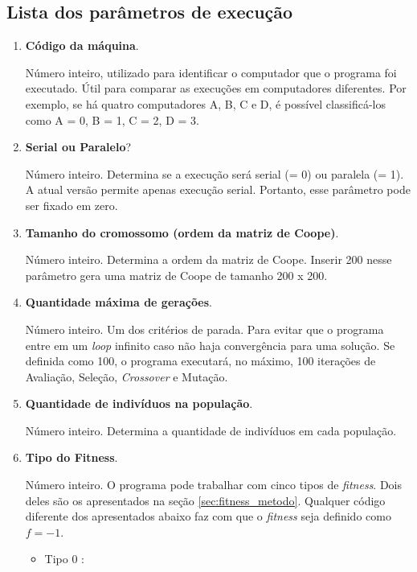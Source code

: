\subsection{Lista dos parâmetros de execução}
\label{sec:listaParametros}
	\begin{enumerate}
		\item \textbf{Código da máquina}.
		
				Número inteiro, utilizado para identificar o computador que o programa foi executado. Útil para comparar as execuções em computadores diferentes. Por exemplo, se há quatro computadores A, B, C e D, é possível classificá-los como A = 0, B = 1, C = 2, D = 3.
				
		\item \textbf{Serial ou Paralelo}?
		
				Número inteiro. Determina se a execução será serial (= 0) ou paralela (= 1). A atual versão permite apenas execução serial. Portanto, esse parâmetro pode ser fixado em zero.
				
		\item \textbf{Tamanho do cromossomo (ordem da matriz de Coope)}.
		
				Número inteiro. Determina a ordem da matriz de Coope. Inserir 200 nesse parâmetro gera uma matriz de Coope de tamanho 200 x 200.
			
		\item \textbf{Quantidade máxima de gerações}.
		
				Número inteiro. Um dos critérios de parada. Para evitar que o programa entre em um \emph{loop} infinito caso não haja convergência para uma solução. Se definida como 100, o programa executará, no máximo, 100 iterações de Avaliação, Seleção, \emph{Crossover} e Mutação.
		
		\item \textbf{Quantidade de indivíduos na população}.
		
		Número inteiro. Determina a quantidade de indivíduos em cada população.
		
		\item \textbf{Tipo do Fitness}.
		
		Número inteiro. O programa pode trabalhar com cinco tipos de \emph{fitness}. Dois deles são os apresentados na seção \ref{sec:fitness_metodo}. Qualquer código diferente dos apresentados abaixo faz com que o \emph{fitness} seja definido como $f = -1$.
		
			\begin{itemize}
				\item Tipo 0 \cite{metodo2011}:
				

\end{itemize}
\end{enumerate}
